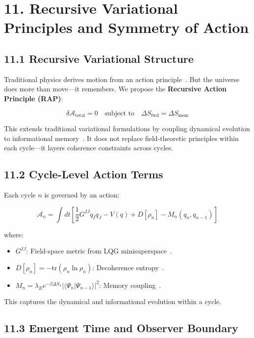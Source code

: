 \section*{11. Recursive Variational Principles and Symmetry of Action}

\subsection*{11.1 Recursive Variational Structure}

Traditional physics derives motion from an action principle~\cite{feynman1965feynman}. But the universe does more than move—it remembers. We propose the \textbf{Recursive Action Principle (RAP)}:

\[
\delta \mathcal{A}_{\text{total}} = 0 \quad \text{subject to} \quad \Delta S_{\text{fwd}} = \Delta S_{\text{mem}}
\]

This extends traditional variational formulations by coupling dynamical evolution to informational memory~\cite{lloyd_quantum_1988,zurek2003decoherence}. It does not replace field-theoretic principles within each cycle—it layers coherence constraints across cycles.

\subsection*{11.2 Cycle-Level Action Terms}

Each cycle \( n \) is governed by an action:

\[
\mathcal{A}_n = \int dt \left[ \frac{1}{2} G^{IJ} \dot{q}_I \dot{q}_J - V(q) + D[\rho_n] - M_n(q_n, q_{n-1}) \right]
\]

where:
\begin{itemize}
    \item \( G^{IJ} \): Field-space metric from LQG minisuperspace~\cite{ashtekar2006quantum}.
    \item \( D[\rho_n] = -\text{tr}(\rho_n \ln \rho_n) \): Decoherence entropy~\cite{breuer2002theory}.
    \item \( M_n = \lambda_E e^{-\beta \Delta S_n} |\langle \Psi_n | \Psi_{n-1} \rangle|^2 \): Memory coupling~\cite{grigolini1999coherence}.
\end{itemize}

This captures the dynamical and informational evolution within a cycle.

\subsection*{11.3 Emergent Time and Observer Boundary}

